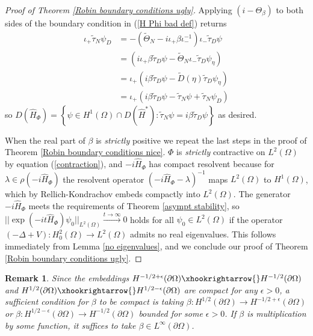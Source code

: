 \documentclass{article}
\numberwithin{equation}{section}
\newtheorem{remark}{Remark}[section]
\begin{document}
\begin{proof}[Proof of Theorem \ref{Robin boundary conditions ugly}]
    Applying $(i- \Theta_\beta)$ to both sides of the boundary condition in (\ref{H Phi bad def}) returns
    \begin{equation}
    \begin{split}
         \iota_+ \tilde\tau_N \psi_D&= - (\tilde\Theta_N- i\iota_+ \beta \iota_-^{-1}) \iota_- \tilde\tau_D \psi
        \\
        &= (i\iota_+ \beta  \tilde\tau_D \psi-\tilde\Theta_N\iota_- \tilde\tau_D \psi_\eta) 
        \\
        &=\iota_+( i \beta \tilde\tau_D \psi-\tilde{D}(\eta) \tilde\tau_D \psi_\eta) 
        \\
        &=\iota_+(i \beta  \tilde\tau_D \psi-\tilde\tau_N \psi + \tilde\tau_N \psi_D ) 
    \end{split}
    \end{equation}
    so $D(\hat{H}_\Phi)=  \left\{\psi \in H^1(\Omega)\cap D(\hat{H}^*):\tilde\tau_N \psi=i \beta \tilde\tau_D \psi \right\}$ as desired.
    
    When the real part of $\beta$ is \textit{strictly} positive we repeat the last steps in the proof of Theorem \ref{Robin boundary conditions nice}. $\Phi$ is \textit{strictly} contractive on $L^2(\Omega)$ by equation (\ref{contraction}), and  $-i\hat{H}_\Phi$ has compact resolvent because for $\lambda \in \rho(-i\hat{H}_\Phi)$ the resolvent operator $(-i\hat{H}_\Phi - \lambda)^{-1}$ maps $L^2(\Omega)$ to $H^1(\Omega)$, which by Rellich-Kondrachov \cite{Brezis} embeds compactly into $L^2(\Omega)$. The generator $-i\hat{H}_\Phi$ meets the requirements of Theorem \ref{asympt stability}, so $||\exp(-it\hat{H}_\Phi)\psi_0||_{L^2(\Omega)}\xrightarrow{t\to \infty}0$ holds for all $\psi_0 \in L^2(\Omega)$ if the operator $(-\Delta+V):H^2_0(\Omega)\to L^2(\Omega)$ admits no real eigenvalues. This follows immediately from Lemma \ref{no eigenvalues}, and we conclude our proof of Theorem \ref{Robin boundary conditions ugly}.
 \end{proof}
 \begin{remark}
        Since the embeddings $H^{-1/2 +\epsilon}(\partial \Omega) \xhookrightarrow{} H^{-1/2}(\partial \Omega)$ and $H^{1/2}(\partial \Omega) \xhookrightarrow{} H^{1/2-\epsilon}(\partial \Omega)$ are compact \cite{Brezis} for any $\epsilon>0$, a sufficient condition for $\beta$ to be compact is taking $\beta:H^{1/2}(\partial \Omega)\to H^{-1/2+\epsilon}(\partial \Omega)$ or $\beta:H^{1/2 -\epsilon}(\partial \Omega)\to H^{-1/2}(\partial \Omega)$ bounded for some $\epsilon>0$.  If $\beta$ is multiplication by some function, it suffices to take $\beta \in L^\infty(\partial \Omega)$.
    \end{remark}
\end{document}
